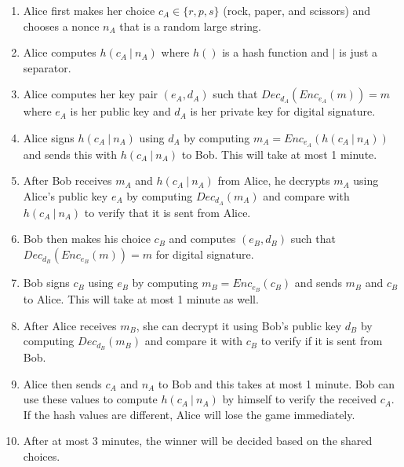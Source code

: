 \documentclass[runningheads]{llncs}
\begin{document}
\begin{enumerate}[\textbf{Step }1\textbf{.} \enspace, leftmargin=7em, itemsep=0.5em]
    \item Alice first makes her choice $c_A \in \{r, p, s\}$ (rock, paper, and scissors) and chooses a nonce $n_A$ that is a random large string.
    
    \item Alice computes $h(c_A\ |\ n_A)$ where $h()$ is a hash function and $|$ is just a separator.
    
    \item Alice computes her key pair $(e_A, d_A)$ such that $Dec_{d_A}(Enc_{e_A}(m)) = m$ where $e_A$ is her public key and $d_A$ is her private key for digital signature.
    
    \item Alice signs $h(c_A\ |\ n_A)$ using $d_A$ by computing $m_A = Enc_{e_A}(h(c_A\ |\ n_A))$ and sends this with $h(c_A\ |\ n_A)$ to Bob. This will take at most 1 minute.
    
    \item After Bob receives $m_A$ and $h(c_A\ |\ n_A)$ from Alice, he decrypts $m_A$ using Alice's public key $e_A$ by computing $Dec_{d_A}(m_A)$ and compare with $h(c_A\ |\ n_A)$ to verify that it is sent from Alice. 
    
    \item Bob then makes his choice $c_B$ and computes $(e_B, d_B)$ such that $Dec_{d_B}(Enc_{e_B}(m)) = m$ for digital signature.
    
    \item Bob signs $c_B$ using $e_B$ by computing $m_B = Enc_{e_B}(c_B)$ and sends $m_B$ and $c_B$ to Alice. This will take at most 1 minute as well.
    
    \item After Alice receives $m_B$, she can decrypt it using Bob's public key $d_B$ by computing $Dec_{d_B}(m_B)$ and compare it with $c_B$ to verify if it is sent from Bob.
    
    \item Alice then sends $c_A$ and $n_A$ to Bob and this takes at most 1 minute. Bob can use these values to compute $h(c_A\ |\ n_A)$ by himself to verify the received $c_A$. If the hash values are different, Alice will lose the game immediately.
    
    \item After at most 3 minutes, the winner will be decided based on the shared choices.
\end{enumerate}
\end{document}
